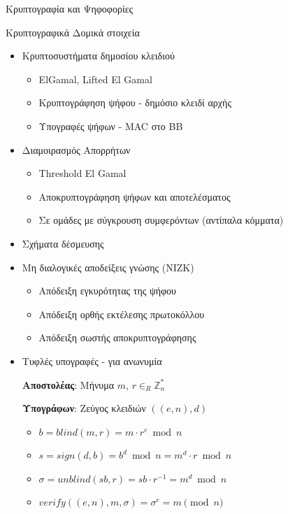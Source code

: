 \documentclass[handout]{beamer}
\begin{document}
\begin{section}{Κρυπτογραφία και Ψηφοφορίες}
\begin{frame}[allowframebreaks]{Κρυπτογραφικά Δομικά στοιχεία} 

  
\begin{itemize}
    \item Κρυπτοσυστήματα δημοσίου κλειδιού
    \begin{itemize}
        \item ElGamal, Lifted El Gamal
        \item Κρυπτογράφηση ψήφου - δημόσιο κλειδί αρχής
        \item Υπογραφές ψήφων - MAC στο BB
    \end{itemize} 
    \item Διαμοιρασμός Απορρήτων
    \begin{itemize}
        \item Threshold El Gamal
        \item Αποκρυπτογράφηση ψήφων και αποτελέσματος
        \item Σε ομάδες με σύγκρουση συμφερόντων (αντίπαλα κόμματα)
    \end{itemize} 
    \item Σχήματα δέσμευσης 
    \framebreak
    \item Μη διαλογικές αποδείξεις γνώσης (NIZK) 
    \begin{itemize}
        \item Απόδειξη εγκυρότητας της ψήφου
        \item Απόδειξη ορθής εκτέλεσης πρωτοκόλλου
        \item Απόδειξη σωστής αποκρυπτογράφησης
    \end{itemize} 
    \item Τυφλές υπογραφές - για ανωνυμία 
    

\textbf{Αποστολέας}: Μήνυμα $m$, $r \in_R \mathbb{Z}_n^*$

\textbf{Υπογράφων}: Ζεύγος κλειδιών $((e,n), d)$

\begin{itemize}  \setlength\itemsep{.1em}
\item $b=blind(m,r) = m \cdot r^e \bmod{n}$
\item $s = sign(d,b) = b^d \bmod{n} =  m^d \cdot r \bmod{n} $
\item $\sigma = unblind(sb,r) = sb \cdot r^{-1} = m^d \bmod{n}$
\item $verify((e,n),m,\sigma) = \sigma^e = m \pmod{n}$
\end{itemize}
\end{itemize}
 

\end{frame}

\end{section} 
\end{document}
